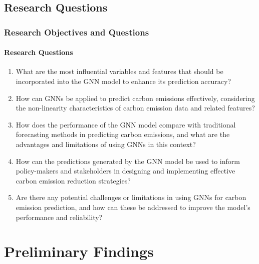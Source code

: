 \documentclass[light]{lutbeamer} %
\begin{document}
\subsection{Research Questions}
\begin{frame}
    \frametitle{Research Objectives and Questions}
    \framesubtitle{Research Questions}
    \begin{enumerate}
        \item What are the most influential variables and features that should be incorporated into the GNN model to enhance its prediction accuracy?
        \item How can GNNs be applied to predict carbon emissions effectively, considering the non-linearity characteristics of carbon emission data and related features?
        \item How does the performance of the GNN model compare with traditional forecasting methods in predicting carbon emissions, and what are the advantages and limitations of using GNNs in this context?
        \item How can the predictions generated by the GNN model be used to inform policy-makers and stakeholders in designing and implementing effective carbon emission reduction strategies?
        \item Are there any potential challenges or limitations in using GNNs for carbon emission prediction, and how can these be addressed to improve the model's performance and reliability?
    \end{enumerate}
\end{frame}
\section{Preliminary Findings}
\end{document}

